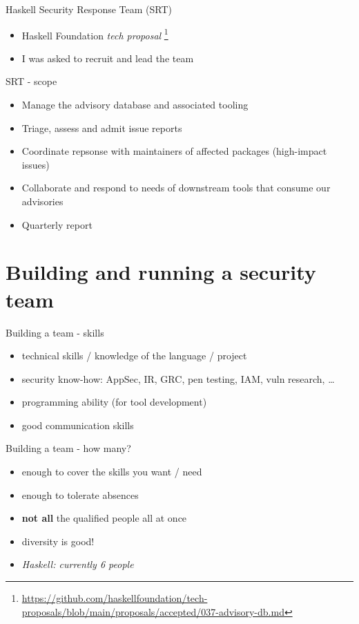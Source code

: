 \documentclass[ignorenonframetext,aspectratio=169,12pt]{beamer}
\begin{document}
\begin{frame}{Haskell Security Response Team (SRT)}
  \begin{itemize}
    \item Haskell Foundation {\em tech proposal}
          \footnote{\url{https://github.com/haskellfoundation/tech-proposals/blob/main/proposals/accepted/037-advisory-db.md}}
    \item I was asked to recruit and lead the team
  \end{itemize}
\end{frame}

\begin{frame}{SRT - scope}
    \begin{itemize}
        \item Manage the advisory database and associated tooling
        \item Triage, assess and admit issue reports
        \item Coordinate repsonse with maintainers of affected
            packages (high-impact issues)
        \item Collaborate and respond to needs of downstream tools
            that consume our advisories
        \item Quarterly report
    \end{itemize}
\end{frame}


\section{Building and running a security team}

\begin{frame}{Building a team - skills}
    \begin{itemize}
        \item technical skills / knowledge of the language / project
        \item security know-how: AppSec, IR, GRC, pen
          testing, IAM, vuln research, \ldots{}
        \item programming ability (for tool development)
        \item good communication skills
    \end{itemize}
\end{frame}

\begin{frame}{Building a team - how many?}
    \begin{itemize}
        \item enough to cover the skills you want / need
        \item enough to tolerate absences
        \item {\bf not all} the qualified people all at once
        \item diversity is good!
        \item {\em Haskell: currently 6 people}
    \end{itemize}
\end{frame}
\end{document}
